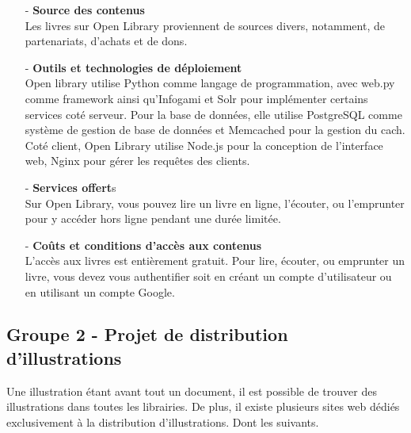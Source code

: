 			\begin{itemize}
				\item[-] \textbf{Source des contenus}\\
				Les livres sur Open Library proviennent de sources divers, notamment, de partenariats, d'achats et de dons.\\

				\item[-] \textbf{Outils et technologies de d\'eploiement}\\
				Open library utilise Python comme langage de programmation, avec web.py comme framework ainsi qu'Infogami et Solr pour impl\'ementer certains services cot\'e serveur. Pour la base de donn\'ees, elle utilise PostgreSQL comme syst\`eme de gestion de base de donn\'ees et Memcached pour la gestion du cach. Cot\'e client, Open Library utilise Node.js pour la conception de l'interface web, Nginx pour g\'erer les requ\^etes des clients.\\

				\item[-] \textbf{Services offert}s\\
				Sur Open Library, vous pouvez lire un livre en ligne, l'\'ecouter, ou l'emprunter pour y acc\'eder hors ligne pendant une dur\'ee limit\'ee.\\

				\item[-] \textbf{Co\^uts et conditions d'acc\`es aux contenus}\\
				L'acc\`es aux livres est enti\`erement gratuit. Pour lire, \'ecouter, ou emprunter un livre, vous devez vous authentifier soit en cr\'eant un compte d'utilisateur ou en utilisant un compte Google.
			\end{itemize}





		\subsection{Groupe 2 - Projet de distribution d'illustrations}
			Une illustration \'etant avant tout un document, il est possible de trouver des illustrations dans toutes les librairies. De plus, il existe plusieurs sites web d\'edi\'es exclusivement \`a la distribution d'illustrations. Dont les suivants.\\

